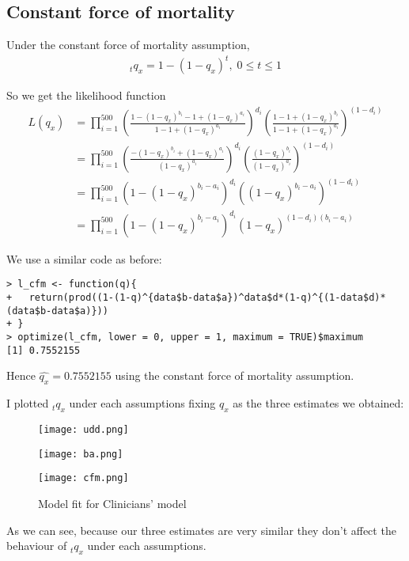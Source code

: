 \documentclass[a4paper,11pt]{article}
\theoremstyle{mytheor}
\begin{document}
\subsection*{Constant force of mortality}

Under the constant force of mortality assumption,
\begin{align*}
    _tq_x = 1- (1-q_x)^t, \; 0\leq t \leq 1
\end{align*}

So we get the likelihood function
\begin{align*}
    L(q_x) & = \prod_{i = 1}^{500}\left(\frac{1 - (1-q_x)^{b_i} -1 + (1-q_x)^{a_i}}{1 -1 + (1-q_x)^{a_i}}\right)^{d_i}\left(\frac{1 - 1 + (1-q_x)^{b_i}}{1 - 1 + (1-q_x)^{a_i}}\right)^{(1-d_i)} \\
    & = \prod_{i = 1}^{500}\left(\frac{ - (1-q_x)^{b_i} + (1-q_x)^{a_i}}{ (1-q_x)^{a_i}}\right)^{d_i}\left(\frac{(1-q_x)^{b_i}}{ (1-q_x)^{a_i}}\right)^{(1-d_i)} \\
    & = \prod_{i = 1}^{500}\left(1 - (1-q_x)^{b_i - a_i} \right)^{d_i}\left((1-q_x)^{b_i -a_i}\right)^{(1-d_i)}\\
    & = \prod_{i = 1}^{500}\left( 1- (1-q_x)^{b_i - a_i} \right)^{d_i}(1-q_x)^{(1-d_i)(b_i -a_i)}
\end{align*}

We use a similar code as before:
\begin{lstlisting}[label={list:second},caption=Code to estimate $q_x$ under the constant force of mortality assumption]
> l_cfm <- function(q){
+   return(prod((1-(1-q)^{data$b-data$a})^data$d*(1-q)^{(1-data$d)*(data$b-data$a)}))
+ }
> optimize(l_cfm, lower = 0, upper = 1, maximum = TRUE)$maximum
[1] 0.7552155
\end{lstlisting}

Hence $\hat{q_x} = 0.7552155$ using the constant force of mortality assumption.

\vspace{5ex}

I plotted $_tq_x$ under each assumptions fixing $q_x$ as the three estimates we obtained:

\begin{figure}[h!]
\centering
\begin{minipage}[t]{0.45\linewidth}
    \texttt{[image: udd.png]}
\end{minipage}
\begin{minipage}[t]{0.45\linewidth}
    \texttt{[image: ba.png]}
\end{minipage}
\begin{minipage}[t]{0.45\linewidth}
    \texttt{[image: cfm.png]}
\end{minipage}
\caption{Model fit for Clinicians' model} 
\label{fig5}
\end{figure}

As we can see, because our three estimates are very similar they don't affect the behaviour of $_tq_x$ under each assumptions.
\end{document}
